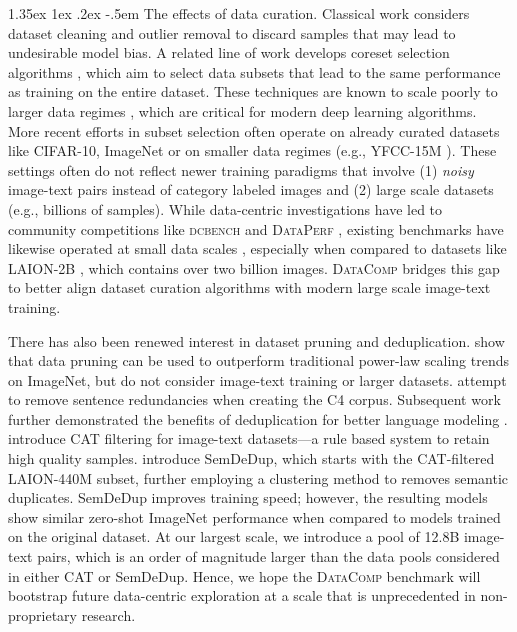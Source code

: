 \documentclass[dvipsnames,11pt]{article}
\makeatletter
\renewcommand\paragraph{\@startsection{paragraph}{4}{\z@}                                     {1.35ex \@plus1ex \@minus.2ex}                                {-.5em}
{\normalfont\normalsize\bfseries}}
\newcommand{\datanet}{\textsc{DataComp}\xspace}
\makeatother
\begin{document}
\paragraph{The effects of data curation.} 
Classical work considers dataset cleaning and outlier removal \cite{jiang2001two,yu2002findout,rousseeuw2011robust,rousseeuw2018anomaly} to discard samples that may lead to undesirable model bias. A related line of work develops coreset selection algorithms \cite{harpeled2004coresets,agarwal2004approximating,Feldman2011Scalable,pmlr-v37-bachem15,lucic2018gaussian,pmlr-v37-wei15,cohen2017input}, which aim to select data subsets that lead to the same performance as training on the entire dataset.
These techniques are known to scale poorly to larger data regimes \cite{guo2022deepcore,abbas2023semdedup}, which are critical for modern deep learning algorithms.
More recent efforts in subset selection often operate on already curated datasets \cite{craig,toneva2018empirical,sener2018active,birodkar2019semantic,coleman2020selection,datadiet} like CIFAR-10, ImageNet or on smaller data regimes (e.g., YFCC-15M \cite{radford2021learning,yfcc100m}).
These settings often do not reflect newer training paradigms that involve (1) \emph{noisy} image-text pairs instead of category labeled images and (2) large scale datasets (e.g., billions of samples).
While data-centric investigations have led to community competitions like \textsc{dcbench} \cite{dcbench} and \textsc{DataPerf} \cite{dataperf}, existing benchmarks have likewise operated at small data scales \cite{datacentric}, especially when compared to datasets like LAION-2B \cite{laion5b}, which contains over two billion images.
\datanet bridges this gap to better align dataset curation algorithms with modern large scale image-text training.


There has also been renewed interest in dataset pruning and deduplication.
\citet{sorscher2022beyond} show that data pruning can be used to outperform traditional power-law scaling trends on ImageNet, but do not consider image-text training or larger datasets.
\citet{raffel2020exploring} attempt to remove sentence redundancies when creating the C4 corpus. Subsequent work further demonstrated the benefits of deduplication for better language modeling \cite{Lee2021DeduplicatingTD}.
\citet{rdk+23} introduce CAT filtering for image-text datasets---a rule based system to retain high quality samples. 
\citet{abbas2023semdedup} introduce SemDeDup, which starts with the CAT-filtered LAION-440M subset, further employing a clustering method to removes semantic duplicates.
SemDeDup improves training speed; however, the resulting models show similar zero-shot ImageNet performance when compared to models trained on the original dataset.
At our largest scale, we introduce a pool of 12.8B image-text pairs, which is an order of magnitude larger than the data pools considered in either CAT or SemDeDup.
Hence, we hope the \datanet benchmark will bootstrap future data-centric exploration at a scale that is unprecedented in non-proprietary research.
\end{document}
